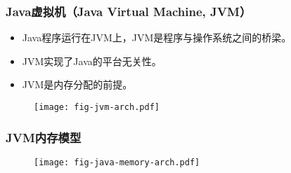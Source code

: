 \begin{frame}[fragile] %
  \frametitle{Java虚拟机（Java Virtual Machine, JVM）}
  
  \begin{itemize}\small
  \item Java程序运行在JVM上，JVM是程序与操作系统之间的桥梁。
  \item JVM实现了Java的平台无关性。
  \item JVM是内存分配的前提。
  \end{itemize}

  \begin{figure}
    \centering
    \texttt{[image: fig-jvm-arch.pdf]}
  \end{figure}
\end{frame}

\begin{frame}[fragile] %
  \frametitle{JVM内存模型}

  
  \begin{figure}
    \centering
    \texttt{[image: fig-java-memory-arch.pdf]}
  \end{figure}
\end{frame}


